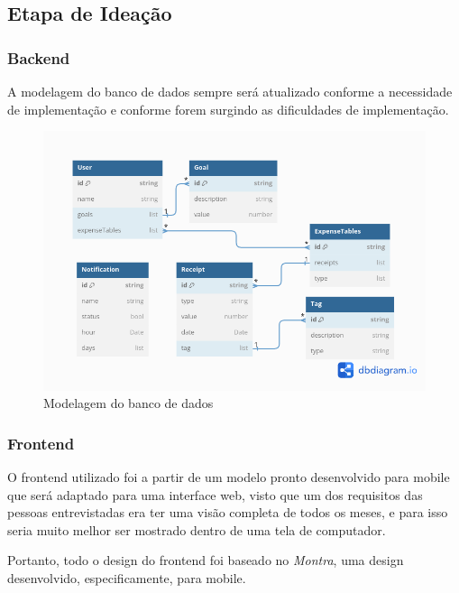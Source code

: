\subsection{Etapa de Ideação}


\subsubsection{Backend}

A modelagem do banco de dados sempre será atualizado conforme a necessidade de implementação e conforme forem surgindo as dificuldades de implementação.

\begin{figure}[!htb]
    \centering
    \caption[short]{Modelagem do banco de dados}
    \includegraphics[scale=0.4]{images/backend_model.png}
\end{figure}


\subsubsection{Frontend}

O frontend utilizado foi a partir de um modelo pronto desenvolvido para mobile que será adaptado para uma interface web, visto que um dos requisitos das pessoas entrevistadas era ter uma visão completa de todos os meses, e para isso seria muito melhor ser mostrado dentro de uma tela de computador.

Portanto, todo o design do frontend foi baseado no \textit{Montra}, uma design desenvolvido, especificamente, para mobile.


